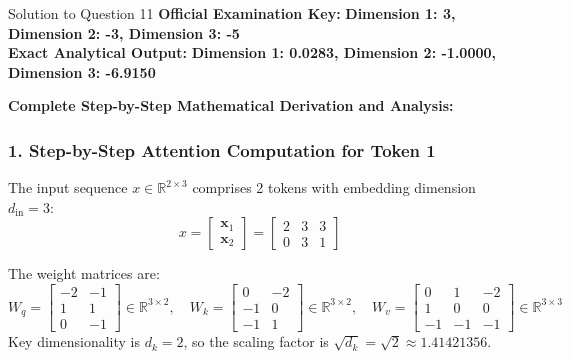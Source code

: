 \documentclass[11pt,a4paper]{article}
\begin{document}
\begin{solutionbox}{Solution to Question 11}
\textbf{Official Examination Key:} \textbf{Dimension 1: 3, \quad Dimension 2: -3, \quad Dimension 3: -5} \\
\textbf{Exact Analytical Output:} \textbf{Dimension 1: 0.0283, \quad Dimension 2: -1.0000, \quad Dimension 3: -6.9150}

\medskip
\textbf{Complete Step-by-Step Mathematical Derivation and Analysis:}

\subsubsection*{1. Step-by-Step Attention Computation for Token 1}
The input sequence $x \in \mathbb{R}^{2 \times 3}$ comprises 2 tokens with embedding dimension $d_{\text{in}} = 3$:
\begin{equation*}
x = \begin{bmatrix} \mathbf{x}_1 \\ \mathbf{x}_2 \end{bmatrix} = \begin{bmatrix} 2 & 3 & 3 \\ 0 & 3 & 1 \end{bmatrix}
\end{equation*}

The weight matrices are:
\begin{equation*}
W_q = \begin{bmatrix} -2 & -1 \\ 1 & 1 \\ 0 & -1 \end{bmatrix} \in \mathbb{R}^{3 \times 2}, \quad
W_k = \begin{bmatrix} 0 & -2 \\ -1 & 0 \\ -1 & 1 \end{bmatrix} \in \mathbb{R}^{3 \times 2}, \quad
W_v = \begin{bmatrix} 0 & 1 & -2 \\ 1 & 0 & 0 \\ -1 & -1 & -1 \end{bmatrix} \in \mathbb{R}^{3 \times 3}
\end{equation*}
Key dimensionality is $d_k = 2$, so the scaling factor is $\sqrt{d_k} = \sqrt{2} \approx 1.41421356$.


\end{solutionbox}
\end{document}
